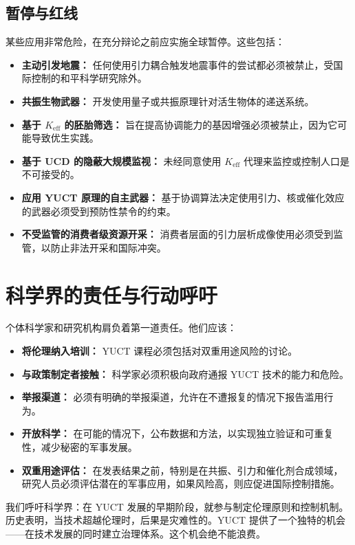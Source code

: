 \documentclass[12pt,a4paper]{article}
\theoremstyle{remark}
\newcommand{\Keff}{K_{\mathrm{eff}}}
\begin{document}
	\subsection{暂停与红线}
	\label{subsec:redlines}
	
	某些应用非常危险，在充分辩论之前应实施全球暂停。这些包括：
	\begin{itemize}[leftmargin=*]
		\item \textbf{主动引发地震：} 任何使用引力耦合触发地震事件的尝试都必须被禁止，受国际控制的和平科学研究除外。
		\item \textbf{共振生物武器：} 开发使用量子或共振原理针对活生物体的递送系统。
		\item \textbf{基于 \(\Keff\) 的胚胎筛选：} 旨在提高协调能力的基因增强必须被禁止，因为它可能导致优生实践。
		\item \textbf{基于 UCD 的隐蔽大规模监视：} 未经同意使用 \(\Keff\) 代理来监控或控制人口是不可接受的。
		\item \textbf{应用 YUCT 原理的自主武器：} 基于协调算法决定使用引力、核或催化效应的武器必须受到预防性禁令的约束。
		\item \textbf{不受监管的消费者级资源开采：} 消费者层面的引力层析成像使用必须受到监管，以防止非法开采和国际冲突。
	\end{itemize}
	
	\section{科学界的责任与行动呼吁}
	\label{sec:scientists}
	
	个体科学家和研究机构肩负着第一道责任。他们应该：
	\begin{itemize}[leftmargin=*]
		\item \textbf{将伦理纳入培训：} YUCT 课程必须包括对双重用途风险的讨论。
		\item \textbf{与政策制定者接触：} 科学家必须积极向政府通报 YUCT 技术的能力和危险。
		\item \textbf{举报渠道：} 必须有明确的举报渠道，允许在不遭报复的情况下报告滥用行为。
		\item \textbf{开放科学：} 在可能的情况下，公布数据和方法，以实现独立验证和可重复性，减少秘密的军事发展。
		\item \textbf{双重用途评估：} 在发表结果之前，特别是在共振、引力和催化剂合成领域，研究人员必须评估潜在的军事应用，如果风险高，则应促进国际控制措施。
	\end{itemize}
	
	我们呼吁科学界：在 YUCT 发展的早期阶段，就参与制定伦理原则和控制机制。历史表明，当技术超越伦理时，后果是灾难性的。YUCT 提供了一个独特的机会——在技术发展的同时建立治理体系。这个机会绝不能浪费。
	
\end{document}
